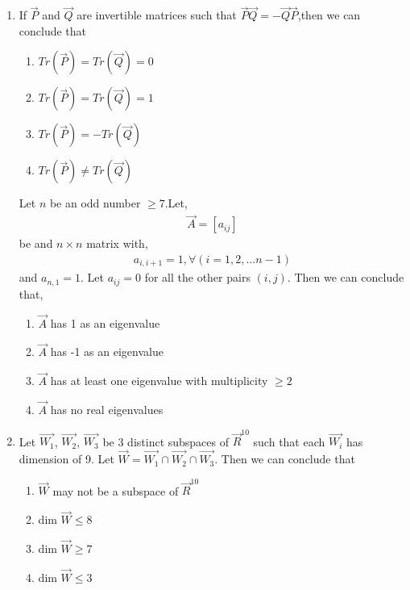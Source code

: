\begin{enumerate}[label=\thesection.\arabic*.,ref=\thesection.\theenumi]
\item If $\vec{P}$ and $\vec{Q}$ are invertible matrices such that   
$\vec{P}\vec{Q} = -\vec{Q}\vec{P}$,then we can conclude that
\begin{enumerate}
\item  $Tr(\vec{P})=Tr(\vec{Q})=0$ \label{eq:solutions/2016/dec/75/1}
\item  $Tr(\vec{P})=Tr(\vec{Q})=1$ \label{eq:solutions/2016/dec/75/2}
\item  $Tr(\vec{P})=-Tr(\vec{Q})$ \label{eq:solutions/2016/dec/75/3}
\item  $Tr(\vec{P}) \neq Tr(\vec{Q})$ \label{eq:solutions/2016/dec/75/4}
\end{enumerate}
%
%
\solution

\twocolumn
Let $n$ be an odd number $\geq7$.Let,
\begin{align}
\vec{A}=[a_{ij}]
\end{align}
be and $n \times n$ matrix with,
\begin{align}
   a_{i,i+1}=1, \forall (i=1,2,...n-1)
\end{align}
and $a_{n,1}=1$. Let $a_{ij}=0$ for all the other pairs $(i,j)$. Then we can conclude that,
\begin{enumerate}
\item{$\vec{A}$ has 1 as an eigenvalue}
\item{$\vec{A}$ has -1 as an eigenvalue}
\item{$\vec{A}$ has at least one eigenvalue with multiplicity $\geq2$}
\item{$\vec{A}$ has no real eigenvalues}
\end{enumerate}
%
\solution

\item Let $\vec{W_1}$, $\vec{W_2}$, $\vec{W_3}$ be 3 distinct subspaces of $\vec{R}^{10}$ such that each $\vec{W_i}$ has dimension of 9. Let $\vec{W} = \vec{W_1} \cap \vec{W_2} \cap \vec{W_3}$. Then we can conclude that\\
\begin{enumerate}
\item $\vec{W}$ may not be a subspace of $\vec{R}^{10}$\\
\item dim $\vec{W} \leq 8$\\
\item dim $\vec{W} \geq 7$\\
\item  dim $\vec{W} \leq 3$\\
\end{enumerate}
\solution

\twocolumn



\end{enumerate}
